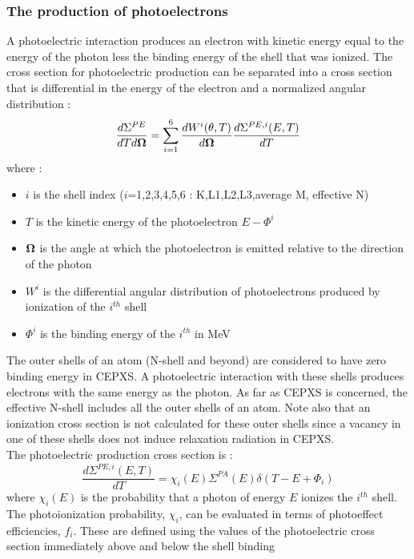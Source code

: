 \subsubsection{The production of photoelectrons}
A photoelectric interaction produces an electron with kinetic energy equal to
the energy of the photon less the binding energy of the shell that was
ionized. The cross section for photoelectric production can be separated into
a cross section that is differential in the energy of the electron and a
normalized angular distribution :
\begin{equation}
\frac{d\Sigma^{PE}}{dT d\boldsymbol{\Omega}} = \sum_{i=1}^6
\frac{dW^i(\theta,T)}{d\boldsymbol{\Omega}} \frac{d\Sigma^{PE,i}(E,T)}{dT}
\end{equation}
where :
\begin{itemize}
\item $i$ is the shell index ($i$=1,2,3,4,5,6 : K,L1,L2,L3,average M,
effective N)
\item $T$ is the kinetic energy of the photoelectron $E-\Phi^i$
\item $\boldsymbol{\Omega}$ is the angle at which the photoelectron is emitted relative to the
direction of the photon
\item $W^i$ is the differential angular distribution of photoelectrons
produced by ionization of the $i^{th}$ shell
\item $\Phi^i$ is the binding energy of the $i^{th}$ in MeV
\end{itemize}
The outer shells of an atom (N-shell and beyond) are considered to have zero
binding energy in CEPXS. A photoelectric interaction with these shells
produces electrons with the same energy as the photon. As far as CEPXS is
concerned, the effective N-shell includes all the outer shells of an atom.
Note also that an ionization cross section is not calculated for these outer
shells since a vacancy in one of these shells does not induce relaxation
radiation in CEPXS.\\
The photoelectric production cross section is :
\begin{equation}
\frac{d\Sigma^{PE,i}(E,T)}{dT} = \chi_i(E) \Sigma^{PA}(E)
\delta(T-E+\Phi_i)
\end{equation}
where $\chi_i(E)$ is the probability that a photon of energy $E$ ionizes the
$i^{th}$ shell.\\
The photoionization probability, $\chi_i$, can be evaluated in terms of
photoeffect efficiencies, $f_i$. These are defined using the values of the
photoelectric cross section immediately above and below the shell binding
